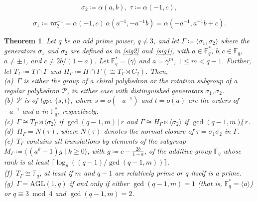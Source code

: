 \documentclass[10pt,a4paper]{amsart}
\newtheorem{theorem}{Theorem}
\begin{document}
\begin{equation}
\label{sig2}
\sigma_{2}\coloneqq \alpha(a,b),\;\tau\coloneqq \alpha(-1,c),
\end{equation}

\begin{equation}
\label{sig1}
\sigma_{1}\coloneqq \tau\sigma_2^{-1} = \alpha(-1,c)\,\alpha(a^{-1},-a^{-1}b)=\alpha(-a^{-1},a^{-1}b+c) .
\end{equation}

\begin{theorem}
\label{gamprops}
Let $q$ be an odd prime power, $q\neq 3$, and let $\Gamma\coloneqq \langle \sigma_1,\sigma_2\rangle$ where the generators $\sigma_1$ and $\sigma_2$ are defined as in \eqref{sig2} and~\eqref{sig1}, with $a\in\mathbb{F}_q^*$, $b,c\in\mathbb{F}_q$, $a\neq \pm 1$, and $c\neq 2b/(1-a)$. Let $\mathbb{F}_q^*=\langle\gamma\rangle$ and $a=\gamma^m$, $1\leq m<q-1$. Further, let $T_\Gamma\coloneqq T\cap \Gamma$ and $H_\Gamma\coloneqq H\cap \Gamma\, (\cong T_\Gamma\rtimes C_2)$. Then, \\[.03in]
(a)\ $\Gamma$ is either the group of a chiral polyhedron or the rotation subgroup of a regular polyhedron $\mathcal{P}$, in either case with distinguished generators $\sigma_1,\sigma_2$. \\[.03in]
(b)\ $\mathcal{P}$ is of type $\{s,t\}$, where $s=o(-a^{-1})$ and $t=o(a)$ are the orders of $-a^{-1}$ and $a$ in $\mathbb{F}_q^*$, respectively. \\[.03in]
(c)\ $\Gamma \cong T_\Gamma \rtimes \langle \sigma_2 \rangle$ if $\gcd(q-1,m)\,|\,r$ and $\Gamma \cong H_\Gamma \ltimes \langle \sigma_2 \rangle$ if $\gcd(q-1,m)\!\!\not|\,r$.\\[.03in]
(d)\ $H_\Gamma = N(\tau)$, where $N(\tau)$ denotes the normal closure of $\tau=\sigma_1\sigma_2$ in $\Gamma$.
\\[.03in]
(e)\ $T_\Gamma$ contains all translations by elements of the subgroup $M_\Gamma \coloneqq  \langle\, (a^k-1)g\mid k\geq 0\rangle$, 
with $g\coloneqq c-\tfrac{2b}{1-a}$, of the additive group $\mathbb{F}_q$ whose rank is at least 
$\lceil \log_{p} ((q-1)/\gcd(q-1,m))\rceil$. \\[.03in]
(f)\ $T_{\Gamma}\cong \mathbb{F}_q$, at least if $m$ and $q-1$ are relatively prime or $q$ itself is a prime.\\[.03in]
(g)\ $\Gamma=\mathrm{AGL}(1,q)$ if and only if either $\gcd(q-1,m)=1$ (that is, $\mathbb{F}_q^*=\langle a\rangle$) or $q\equiv 3\bmod 4$ and ${\gcd(q-1,m)=2}$.
\end{theorem}
\end{document}
